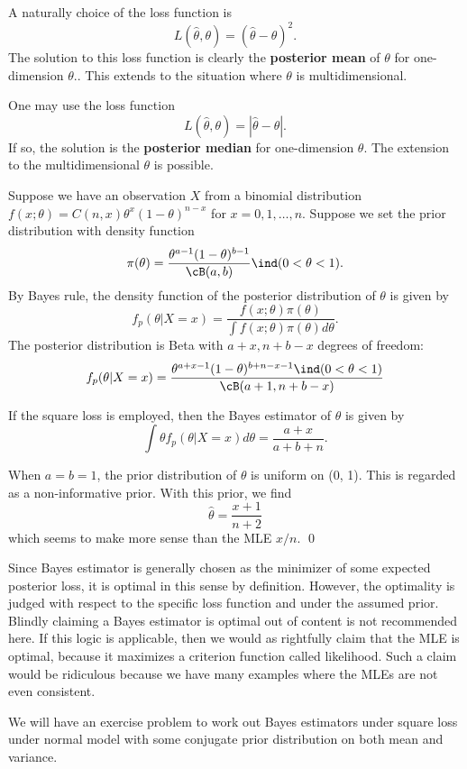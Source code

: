 A naturally choice of the loss function is 
\[
L(\hat \theta, \theta) = (\hat \theta - \theta)^2.
\]
The solution to this loss function
is clearly the {\bf posterior mean} of $\theta$
 for one-dimension $\theta$..
This extends to the situation where $\theta$ is multidimensional.
 
One may use the loss function
\[
L(\hat \theta, \theta) = |\hat \theta - \theta|.
\]
If so, the solution is the {\bf posterior median} for one-dimension $\theta$.
The extension to the multidimensional $\theta$ is possible.

\begin{example}
Suppose we have an observation $X$ from a binomial distribution
$f(x; \theta) = C(n, x) \theta^x (1-\theta)^{n-x}$ for $x=0, 1, \ldots, n$.
Suppose we set the prior distribution with density function
\[
\pi(\theta) = \frac{\theta^{a-1} (1-\theta)^{b-1}}{\cB(a, b)}\ind(0 < \theta < 1).
\]
By Bayes rule, the density function of the posterior distribution of $\theta$
is given by
\[
f_p (\theta | X=x) 
= \frac{f(x; \theta) \pi(\theta)}{\int f(x; \theta) \pi(\theta) d\theta}.
\]
The posterior distribution is Beta with $a+x, n+b - x$
degrees of freedom:
\[
f_p (\theta | X=x) 
= \frac{ \theta^{a+x - 1} (1-\theta)^{b+n- x - 1} \ind(0 < \theta < 1)}
{\cB(a+1, n+b - x)}
\]

If the square loss is employed, then the Bayes estimator of $\theta$
is given by
\[
\int \theta f_p (\theta | X=x) d\theta = \frac{a+x}{a+b+n}.
\]

When $a= b = 1$, the prior distribution of $\theta$ is uniform on 
(0, 1). This is regarded as a non-informative prior. With this prior,
we find
\[
\hat \theta = \frac{x+1}{n+2}
\]
which seems to make more sense than the MLE $x/n$.
\qed
\end{example}

Since Bayes estimator is generally chosen as the minimizer of
some expected posterior loss, it is optimal in this sense
by definition. However, the optimality is judged with respect to
the specific loss function and under the assumed prior.
Blindly claiming a Bayes estimator is optimal out of content
is not recommended here. If this logic is applicable, then 
we would as rightfully claim that the MLE is optimal, 
because it maximizes a criterion function called likelihood.
Such a claim would be ridiculous because we have many examples 
where the MLEs are not even consistent.

We will have an exercise problem to work out Bayes
estimators under square loss under normal model
with some conjugate prior distribution on both mean
and variance.

